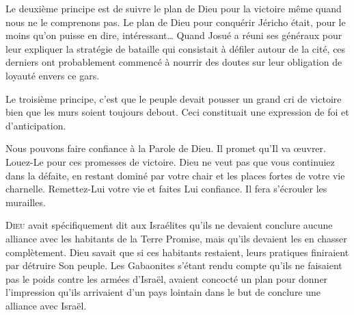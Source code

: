 Le deuxième principe est de suivre le plan de Dieu pour la victoire
 même quand nous ne le comprenons pas.
 Le plan de Dieu pour conquérir Jéricho était,
 pour le moins qu'on puisse en dire, intéressant\dots{}
 Quand Josué a réuni ses généraux pour leur expliquer
 la stratégie de bataille qui consistait à défiler autour de la cité,
 ces derniers ont probablement commencé à nourrir des doutes
 sur leur obligation de loyauté envers ce gars.



Le troisième principe, c'est que le peuple devait pousser
 un grand cri de victoire \ocadr bien que les murs soient toujours debout.
 Ceci constituait une expression de foi et d'anticipation.

Nous pouvons faire confiance à la Parole de Dieu. Il promet qu'Il va \oe{}uvrer.
 Louez-Le pour ces promesses de victoire.
 Dieu ne veut pas que vous continuiez dans la défaite,
 en restant dominé par votre chair et les places fortes de votre vie charnelle.
 Remettez-Lui votre vie et faites Lui confiance.
 Il fera s'écrouler les murailles. 

\dvrule






\lettrine{D}{ieu} avait spécifiquement dit aux Israélites
 qu'ils ne devaient conclure aucune alliance avec les habitants
 de la Terre Promise, mais qu'ils devaient les en chasser complètement.
 Dieu savait que si ces habitants restaient, leurs pratiques finiraient
 par détruire Son peuple.
 Les Gabaonites s'étant rendu compte qu'ils ne faisaient
 pas le poids contre les armées d'Israël,
 avaient concocté un plan pour donner l'impression
 qu'ils arrivaient d'un pays lointain
 dans le but de conclure une alliance avec Israël.

